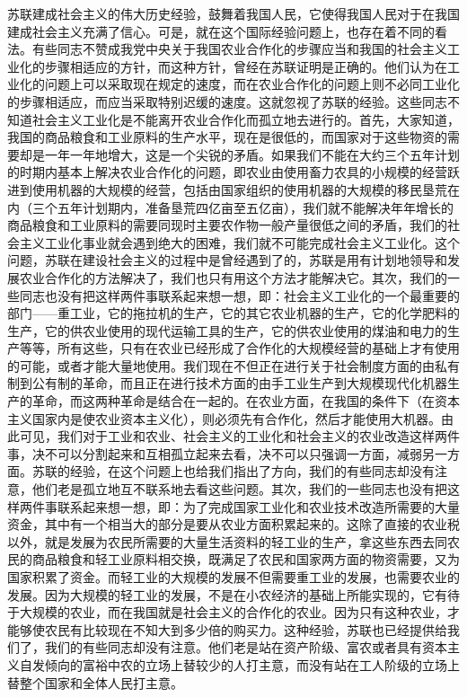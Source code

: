 苏联建成社会主义的伟大历史经验，鼓舞着我国人民，它使得我国人民对于在我国建成社会主义充满了信心。可是，就在这个国际经验问题上，也存在着不同的看法。有些同志不赞成我党中央关于我国农业合作化的步骤应当和我国的社会主义工业化的步骤相适应的方针，而这种方针，曾经在苏联证明是正确的。他们认为在工业化的问题上可以采取现在规定的速度，而在农业合作化的问题上则不必同工业化的步骤相适应，而应当采取特别迟缓的速度。这就忽视了苏联的经验。这些同志不知道社会主义工业化是不能离开农业合作化而孤立地去进行的。首先，大家知道，我国的商品粮食和工业原料的生产水平，现在是很低的，而国家对于这些物资的需要却是一年一年地增大，这是一个尖锐的矛盾。如果我们不能在大约三个五年计划的时期内基本上解决农业合作化的问题，即农业由使用畜力农具的小规模的经营跃进到使用机器的大规模的经营，包括由国家组织的使用机器的大规模的移民垦荒在内（三个五年计划期内，准备垦荒四亿亩至五亿亩），我们就不能解决年年增长的商品粮食和工业原料的需要同现时主要农作物一般产量很低之间的矛盾，我们的社会主义工业化事业就会遇到绝大的困难，我们就不可能完成社会主义工业化。这个问题，苏联在建设社会主义的过程中是曾经遇到了的，苏联是用有计划地领导和发展农业合作化的方法解决了，我们也只有用这个方法才能解决它。其次，我们的一些同志也没有把这样两件事联系起来想一想，即：社会主义工业化的一个最重要的部门——重工业，它的拖拉机的生产，它的其它农业机器的生产，它的化学肥料的生产，它的供农业使用的现代运输工具的生产，它的供农业使用的煤油和电力的生产等等，所有这些，只有在农业已经形成了合作化的大规模经营的基础上才有使用的可能，或者才能大量地使用。我们现在不但正在进行关于社会制度方面的由私有制到公有制的革命，而且正在进行技术方面的由手工业生产到大规模现代化机器生产的革命，而这两种革命是结合在一起的。在农业方面，在我国的条件下（在资本主义国家内是使农业资本主义化），则必须先有合作化，然后才能使用大机器。由此可见，我们对于工业和农业、社会主义的工业化和社会主义的农业改造这样两件事，决不可以分割起来和互相孤立起来去看，决不可以只强调一方面，减弱另一方面。苏联的经验，在这个问题上也给我们指出了方向，我们的有些同志却没有注意，他们老是孤立地互不联系地去看这些问题。其次，我们的一些同志也没有把这样两件事联系起来想一想，即：为了完成国家工业化和农业技术改造所需要的大量资金，其中有一个相当大的部分是要从农业方面积累起来的。这除了直接的农业税以外，就是发展为农民所需要的大量生活资料的轻工业的生产，拿这些东西去同农民的商品粮食和轻工业原料相交换，既满足了农民和国家两方面的物资需要，又为国家积累了资金。而轻工业的大规模的发展不但需要重工业的发展，也需要农业的发展。因为大规模的轻工业的发展，不是在小农经济的基础上所能实现的，它有待于大规模的农业，而在我国就是社会主义的合作化的农业。因为只有这种农业，才能够使农民有比较现在不知大到多少倍的购买力。这种经验，苏联也已经提供给我们了，我们的有些同志却没有注意。他们老是站在资产阶级、富农或者具有资本主义自发倾向的富裕中农的立场上替较少的人打主意，而没有站在工人阶级的立场上替整个国家和全体人民打主意。

